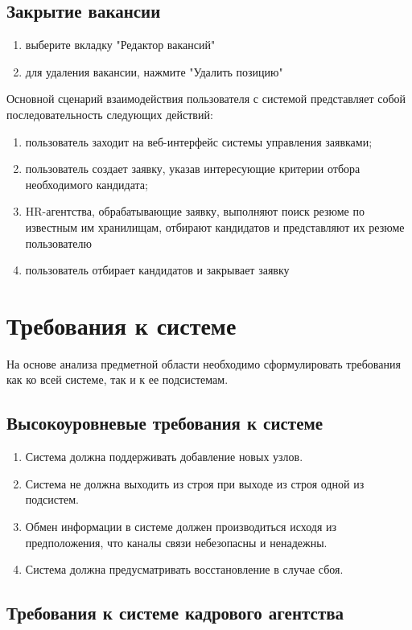 \subsection{Закрытие вакансии}
\begin{enumerate}
\item выберите вкладку "Редактор вакансий"
\item для удаления вакансии, нажмите "Удалить позицию"
\end{enumerate}

Основной сценарий взаимодействия пользователя с системой представляет собой последовательность следующих действий:
\begin{enumerate}
\item пользователь заходит на веб-интерфейс системы управления заявками;
\item пользователь создает заявку, указав интересующие критерии отбора необходимого кандидата;
\item HR-агентства, обрабатывающие заявку, выполняют поиск резюме по известным им хранилищам, отбирают кандидатов и представляют их резюме пользователю
\item пользователь отбирает кандидатов и закрывает заявку
\end{enumerate}

\section{Требования к системе}
На основе анализа предметной области необходимо сформулировать требования как ко всей системе, так и к ее подсистемам.

\subsection{Высокоуровневые требования к системе}
\begin{enumerate}
\item Система должна поддерживать добавление новых узлов.
\item Система не должна выходить из строя при выходе из строя одной из подсистем.
\item Обмен информации в системе должен производиться исходя из предположения, что каналы связи небезопасны и ненадежны.
\item Система должна предусматривать восстановление в случае сбоя.
\end{enumerate}

\subsection{Требования к системе кадрового агентства}

